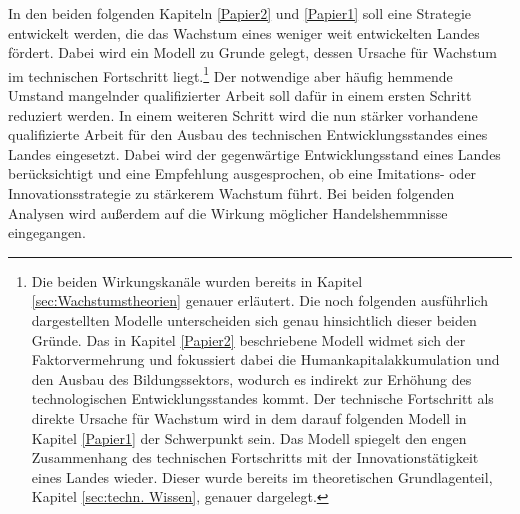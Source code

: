 In den beiden folgenden Kapiteln \ref{Papier2} und \ref{Papier1} soll eine Strategie entwickelt werden, die das Wachstum eines weniger weit entwickelten Landes f{\"o}rdert. Dabei wird ein Modell zu Grunde gelegt, dessen Ursache f{\"u}r Wachstum im technischen Fortschritt liegt.\footnote{Die beiden Wirkungskan{\"a}le wurden bereits in Kapitel \ref{sec:Wachstumstheorien} genauer erl{\"a}utert. Die noch folgenden ausf{\"u}hrlich dargestellten Modelle unterscheiden sich genau hinsichtlich dieser beiden Gr{\"u}nde. Das in Kapitel \ref{Papier2} beschriebene Modell widmet sich der Faktorvermehrung und fokussiert dabei die Humankapitalakkumulation und den Ausbau des Bildungssektors, wodurch es indirekt zur Erh{\"o}hung des technologischen Entwicklungsstandes kommt. Der technische Fortschritt als direkte Ursache f{\"u}r Wachstum wird in dem darauf folgenden Modell in Kapitel \ref{Papier1} der Schwerpunkt sein. Das Modell spiegelt den engen Zusammenhang des technischen Fortschritts mit der Innovationst{\"a}tigkeit eines Landes wieder. Dieser wurde bereits im theoretischen Grundlagenteil, Kapitel \ref{sec:techn. Wissen}, genauer dargelegt.} Der notwendige aber h{\"a}ufig hemmende Umstand mangelnder qualifizierter Arbeit soll daf{\"u}r in einem ersten Schritt reduziert werden. 
In einem weiteren Schritt wird die nun st{\"a}rker vorhandene qualifizierte Arbeit f{\"u}r den Ausbau des technischen Entwicklungsstandes eines Landes eingesetzt. Dabei wird der gegenw{\"a}rtige Entwicklungsstand eines Landes ber{\"u}cksichtigt und eine Empfehlung ausgesprochen, ob eine Imitations- oder Innovationsstrategie zu st{\"a}rkerem Wachstum f{\"u}hrt. Bei beiden folgenden Analysen wird au{\ss}erdem auf die Wirkung m{\"o}glicher Handelshemmnisse eingegangen. 